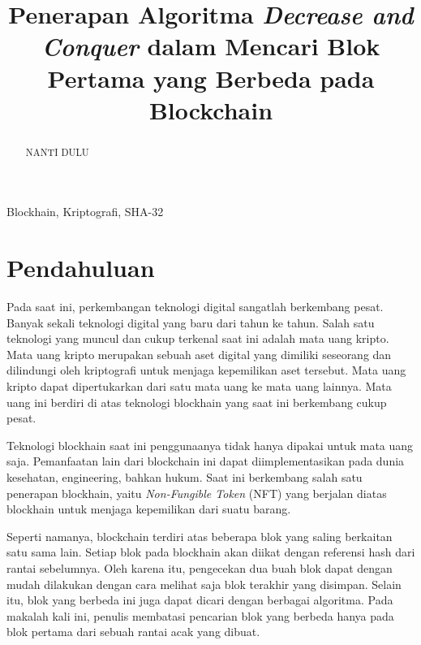 \documentclass[10pt,conference]{IEEEtran}
\theoremstyle{definition}
\begin{document}
\title{Penerapan Algoritma  \emph{Decrease and Conquer} dalam Mencari Blok Pertama yang Berbeda pada Blockchain}

\author{
}

\maketitle

\begin{abstract}
NANTI DULU
\end{abstract}

\begin{IEEEkeywords}
Blockhain, Kriptografi, SHA-32
\end{IEEEkeywords}

\section{Pendahuluan}
Pada saat ini, perkembangan teknologi digital sangatlah berkembang pesat. Banyak sekali teknologi digital yang baru dari tahun ke tahun. Salah satu teknologi yang muncul dan cukup terkenal saat ini adalah mata uang kripto. Mata uang kripto merupakan sebuah aset digital yang dimiliki seseorang dan dilindungi oleh kriptografi untuk menjaga kepemilikan aset tersebut. Mata uang kripto dapat dipertukarkan dari satu mata uang ke mata uang lainnya. Mata uang ini berdiri di atas teknologi blockhain yang saat ini berkembang cukup pesat.

Teknologi blockhain saat ini penggunaanya tidak hanya dipakai untuk mata uang saja. Pemanfaatan lain dari blockchain ini dapat diimplementasikan pada dunia kesehatan, engineering, bahkan hukum. Saat ini berkembang salah satu penerapan blockhain, yaitu \emph{Non-Fungible Token} (NFT) yang berjalan diatas blockhain untuk menjaga kepemilikan dari suatu barang.

Seperti namanya, blockchain terdiri atas beberapa blok yang saling berkaitan satu sama lain. Setiap blok pada blockhain akan diikat dengan referensi hash dari rantai sebelumnya. Oleh karena itu, pengecekan dua buah blok dapat dengan mudah dilakukan dengan cara melihat saja blok terakhir yang disimpan. Selain itu, blok yang  berbeda ini juga dapat dicari dengan berbagai algoritma. Pada makalah kali ini, penulis membatasi pencarian blok yang berbeda hanya pada blok pertama dari sebuah rantai acak yang dibuat.
\end{document}
